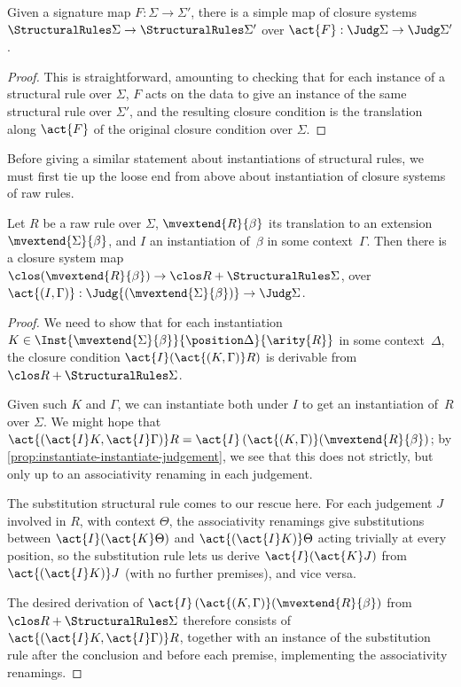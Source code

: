 \begin{proposition}
  \label{prop:structural-rules-under-signature-map}%
  Given a signature map $F : \Sigma \to \Sigma'$, there is a simple map of closure systems $\StructuralRules \Sigma \to \StructuralRules \Sigma'$ over $\act{F} : \Judg \Sigma \to \Judg \Sigma'$.
\end{proposition}

\begin{proof}
  This is straightforward, amounting to checking that for each instance of a structural rule over $\Sigma$, $F$ acts on the data to give an instance of the same structural rule over $\Sigma'$, and the resulting closure condition is the translation along $\act{F}$ of the original closure condition over $\Sigma$.
\end{proof}

Before giving a similar statement about instantiations of structural rules, we must first tie up the loose end from above about instantiation of closure systems of raw rules.

\begin{proposition} \label{prop:instantiation-of-closure-system-of-raw-rule}
  Let $R$ be a raw rule over $\Sigma$, $\mvextend{R}{\beta}$ its translation to an extension $\mvextend{\Sigma}{\beta}$, and $I$ an instantiation of~$\beta$ in some context~$\Gamma$.
  Then there is a closure system map $\clos (\mvextend{R}{\beta}) \to \clos R + \StructuralRules \Sigma$, over $\act{(I,\Gamma)} : \Judg{(\mvextend{\Sigma}{\beta})} \to \Judg \Sigma$.
\end{proposition}

\begin{proof}
  We need to show that for each instantiation $K \in \Inst{\mvextend{\Sigma}{\beta}}{\position \Delta}{\arity{R}}$ in some context~$\Delta$, the closure condition $\act{I} (\act{(K,\Gamma)} R)$ is derivable from $\clos R + \StructuralRules \Sigma$.

  Given such $K$ and $\Gamma$, we can instantiate both under $I$ to get an instantiation of~$R$ over $\Sigma$.
  We might hope that $\act{(\act{I}K,\act{I}\Gamma)}R = \act{I}\left(\act{(K,\Gamma)}(\mvextend{R}{\beta}\right)$;
  by \cref{prop:instantiate-instantiate-judgement}, we see that this does not strictly, but only up to an associativity renaming in each judgement.

  The substitution structural rule comes to our rescue here.
  For each judgement $J$ involved in $R$, with context $\Theta$, the associativity renamings give substitutions between $\act{I}(\act{K}\Theta)$ and $\act{(\act{I}K)}\Theta$ acting trivially at every position, so the substitution rule lets us derive $\act{I}(\act{K}J)$ from $\act{(\act{I}K)}J$ (with no further premises), and vice versa.

  The desired derivation of $\act{I}\left(\act{(K,\Gamma)}(\mvextend{R}{\beta}\right)$ from $\clos R + \StructuralRules \Sigma$ therefore consists of $\act{(\act{I}K,\act{I}\Gamma)}R$, together with an instance of the substitution rule after the conclusion and before each premise, implementing the associativity renamings.
\end{proof}

